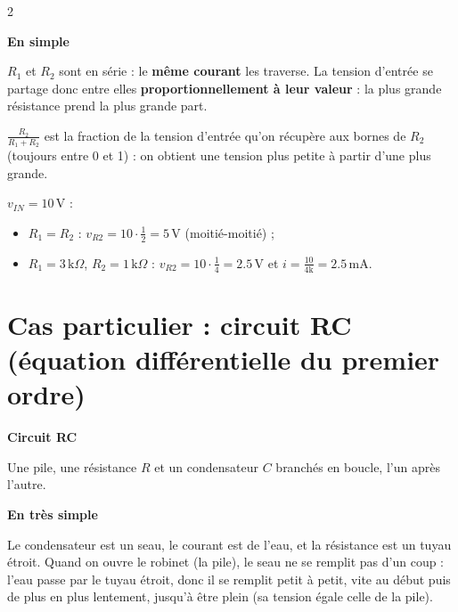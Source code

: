 \documentclass[a4paper,9pt]{extarticle}
\begin{document}
\begin{multicols}{2}
\begin{important}

\textbf{En simple}

$R_1$ et $R_2$ sont en série : le \textbf{même courant} les traverse. La tension d'entrée se partage donc entre elles \textbf{proportionnellement à leur valeur} : la plus grande résistance prend la plus grande part.

\vspace{3pt}

$\frac{R_2}{R_1 + R_2}$ est la fraction de la tension d'entrée qu'on récupère aux bornes de $R_2$ (toujours entre 0 et 1) : on obtient une tension plus petite à partir d'une plus grande.

\end{important}


\begin{example}

$v_{IN} = 10\,\text{V}$ :

\begin{itemize}

\item $R_1 = R_2$ : $v_{R2} = 10 \cdot \frac{1}{2} = 5\,\text{V}$ (moitié-moitié) ;

\item $R_1 = 3\,\text{k}\Omega$, $R_2 = 1\,\text{k}\Omega$ : $v_{R2} = 10 \cdot \frac{1}{4} = 2.5\,\text{V}$ et $i = \frac{10}{4\text{k}} = 2.5\,\text{mA}$.

\end{itemize}

\end{example}


\section{Cas particulier : circuit RC (équation différentielle du premier ordre)}


\begin{definition}

\textbf{Circuit RC}

Une pile, une résistance $R$ et un condensateur $C$ branchés en boucle, l'un après l'autre.

\vspace{3pt}

\textbf{En très simple}

Le condensateur est un seau, le courant est de l'eau, et la résistance est un tuyau étroit. Quand on ouvre le robinet (la pile), le seau ne se remplit pas d'un coup : l'eau passe par le tuyau étroit, donc il se remplit petit à petit, vite au début puis de plus en plus lentement, jusqu'à être plein (sa tension égale celle de la pile).


\end{definition}
\end{multicols}
\end{document}
